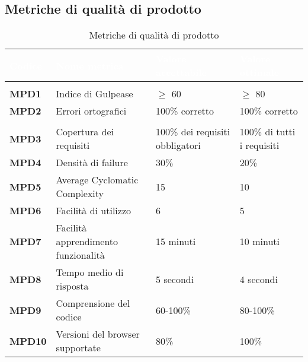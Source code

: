 \newpage

\subsection{Metriche di qualità di prodotto}

\renewcommand{\arraystretch}{1.5}
\centering
\begin{longtable}{C{2.5cm} | C{4cm} | C{5cm} | C{3.5cm}}
\textcolor{white}{\textbf{Codice}}&
\textcolor{white}{\textbf{Nome metrica}}&
\textcolor{white}{\textbf{Valore accettabile}}&
\textcolor{white}{\textbf{Valore ottimale}}\\	
\endhead
\endfoot
{}\caption{Metriche di qualità di prodotto}
\endlastfoot

 \\

	\textbf{MPD1} & Indice di Gulpease & $\geq$ 60 & $\geq$ 80\\
	\textbf{MPD2} & Errori ortografici & 100\% corretto & 100\% corretto \\
	
 \\

	\textbf{MPD3} & Copertura dei requisiti & 100\% dei requisiti obbligatori & 100\% di tutti i requisiti \\
		
	\textbf{MPD4} & Densità di failure & 30\% & 20\% \\

	\textbf{MPD5} & Average Cyclomatic Complexity & 15 & 10 \\		
	\textbf{MPD6} & Facilità di utilizzo & 6 & 5 \\
	\textbf{MPD7} & Facilità apprendimento funzionalità & 15 minuti & 10 minuti\\

 	\textbf{MPD8} & Tempo medio di risposta & 5 secondi & 4 secondi \\
	
 	\textbf{MPD9} & Comprensione del codice & 60-100\% & 80-100\% \\

	\textbf{MPD10} & Versioni del browser supportate & 80\% & 100\% \\
\end{longtable}


	

